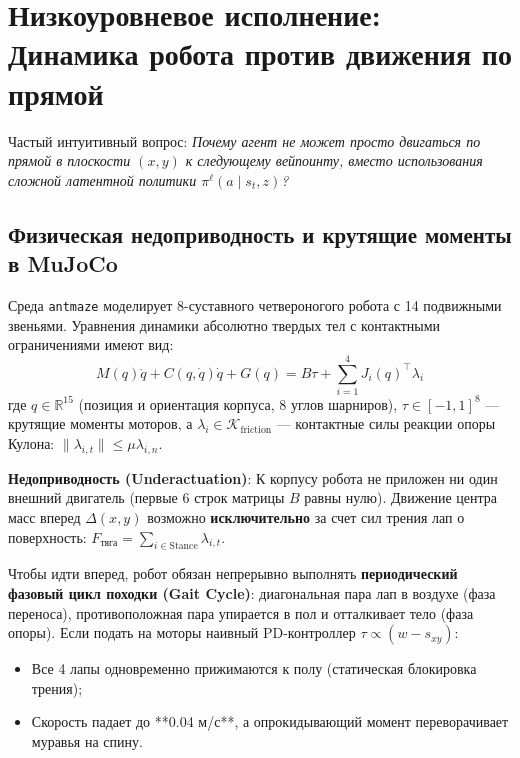 \section{Низкоуровневое исполнение: Динамика робота против движения по прямой}

Частый интуитивный вопрос: \textit{Почему агент не может просто двигаться по прямой в плоскости $(x, y)$ к следующему вейпоинту, вместо использования сложной латентной политики $\pi^\ell(a \mid s_t, z)$?}

\subsection{Физическая недоприводность и крутящие моменты в MuJoCo}
Среда \texttt{antmaze} моделирует 8-суставного четвероногого робота с 14 подвижными звеньями. Уравнения динамики абсолютно твердых тел с контактными ограничениями имеют вид:
\begin{equation}
    M(q)\ddot{q} + C(q, \dot{q})\dot{q} + G(q) = B \tau + \sum_{i=1}^4 J_i(q)^\top \lambda_i
\end{equation}
где $q \in \mathbb{R}^{15}$ (позиция и ориентация корпуса, 8 углов шарниров), $\tau \in [-1, 1]^8$ — крутящие моменты моторов, а $\lambda_i \in \mathcal{K}_{\text{friction}}$ — контактные силы реакции опоры Кулона: $\|\lambda_{i,t}\| \le \mu \lambda_{i,n}$.

\textbf{Недоприводность (Underactuation)}: К корпусу робота не приложен ни один внешний двигатель (первые 6 строк матрицы $B$ равны нулю). Движение центра масс вперед $\Delta (x, y)$ возможно \textbf{исключительно} за счет сил трения лап о поверхность: $F_{\text{тяга}} = \sum_{i \in \text{Stance}} \lambda_{i,t}$.

\begin{keyinsight}
Чтобы идти вперед, робот обязан непрерывно выполнять \textbf{периодический фазовый цикл походки (Gait Cycle)}: диагональная пара лап в воздухе (фаза переноса), противоположная пара упирается в пол и отталкивает тело (фаза опоры). 
Если подать на моторы наивный PD-контроллер $\tau \propto (w - s_{xy})$:
\begin{itemize}[leftmargin=*,noitemsep]
    \item Все 4 лапы одновременно прижимаются к полу (статическая блокировка трения);
    \item Скорость падает до **0.04 м/с**, а опрокидывающий момент переворачивает муравья на спину.
\end{itemize}
\end{keyinsight}

